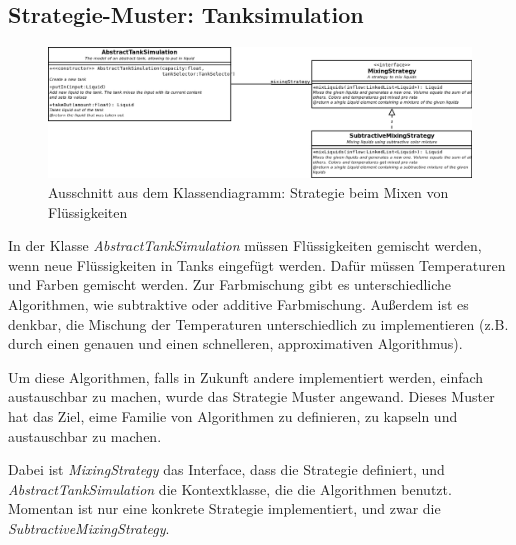 \documentclass[parskip=full]{scrartcl}
\begin{document}
\subsection{Strategie-Muster: Tanksimulation}
\begin{figure}[H]
  \centering
  \includegraphics[scale=0.35]{design/pattern-screenshots/strategy-MixingStrategy.png}
  \caption{Ausschnitt aus dem Klassendiagramm: Strategie beim Mixen von Flüssigkeiten}
\end{figure}
In der Klasse \emph{AbstractTankSimulation} müssen Flüssigkeiten gemischt werden, wenn neue Flüssigkeiten in Tanks eingefügt werden.
Dafür müssen Temperaturen und Farben gemischt werden. Zur Farbmischung gibt es unterschiedliche Algorithmen, wie subtraktive oder additive
Farbmischung. Außerdem ist es denkbar, die Mischung der Temperaturen unterschiedlich zu implementieren (z.B. durch einen genauen und einen schnelleren,
approximativen Algorithmus).

Um diese Algorithmen, falls in Zukunft andere implementiert werden, einfach austauschbar zu machen, wurde
das Strategie Muster angewand. Dieses Muster hat das Ziel, eime Familie von Algorithmen zu definieren, zu kapseln und austauschbar zu machen.

Dabei ist \emph{MixingStrategy} das Interface, dass die Strategie definiert, und \emph{AbstractTankSimulation} die Kontextklasse, die die Algorithmen
benutzt. Momentan ist nur eine konkrete Strategie implementiert, und zwar die \emph{SubtractiveMixingStrategy}.

\pagebreak
\end{document}
